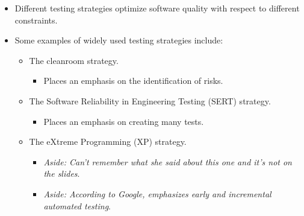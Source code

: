 \documentclass{article}
\newcounter{example}
\begin{document}
\begin{itemize}
\begin{enumerate}
		\item Details.
		\begin{itemize}
			\item Specifies important considerations of the testing strategy.
			\item For example:
			\begin{itemize}
				\item How risks are identified.
				\item How risks can be minimized.
				\item What metrics can help track risks.
			\end{itemize}
		\end{itemize}
	\end{enumerate}
	\item Different testing strategies optimize software quality with respect to different constraints.
	\item Some examples of widely used testing strategies include:
	\begin{itemize}
		\item The cleanroom strategy.
		\begin{itemize}
			\item Places an emphasis on the identification of risks.
		\end{itemize}
		\item The Software Reliability in Engineering Testing (SERT) strategy.
		\begin{itemize}
			\item Places an emphasis on creating many tests.
		\end{itemize}
		\item The eXtreme Programming (XP) strategy.
		\begin{itemize}
			\item \emph{Aside: Can't remember what she said about this one and it's not on the slides}.
			\item \emph{Aside: According to Google, emphasizes early and incremental automated testing}.
		\end{itemize}
	\end{itemize}
\end{itemize}

\ifdefined\iscombined
	\newpage
\else
	
\end{document}
